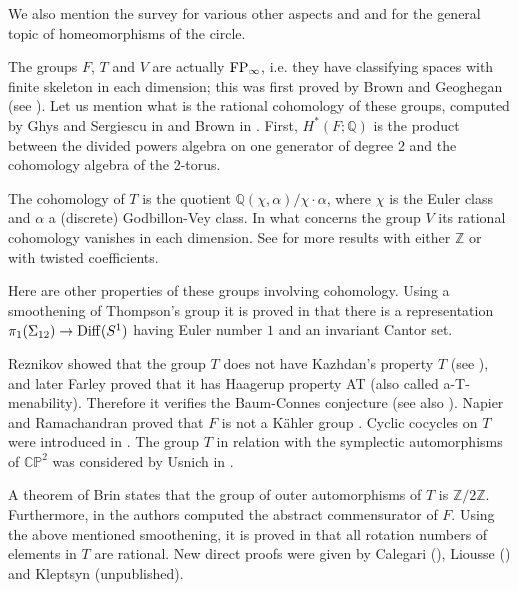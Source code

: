 \documentclass[twoside]{irmaems}
\theoremstyle{plain}
\theoremstyle{definition}
\theoremstyle{remark}
\newcommand{\Z}{{\mathbb{Z}}}
\newcommand{\Q}{{\mathbb{Q}}}
\begin{document}
\vspace{0.1cm}\noindent 
We also mention the survey \cite{ser} for various other aspects and  \cite{Gh} and 
\cite{navas} for the general topic of homeomorphisms of the circle.

\vspace{0.1cm}\noindent 
The groups $F$, $T$ and $V$ are actually ${\rm FP}_{\infty}$, 
i.e. they have classifying spaces with finite skeleton 
in each dimension; this was first proved by Brown  
and Geoghegan (see \cite{BrGe,br1}). 
Let us mention what is the rational cohomology of these
groups, computed by Ghys and Sergiescu in \cite{gh-se} and Brown in 
\cite{br2}. First, $H^*(F;\Q)$ 
is the product between the divided powers algebra
on one generator of degree 2 and the cohomology algebra of the
2-torus.

\vspace{0.1cm}\noindent 
The cohomology of $T$ is the quotient $\Q(\chi,\alpha)/\chi\cdot \alpha$, 
where $\chi$ is the Euler class and $\alpha$ a (discrete) Godbillon-Vey class. 
In what concerns the group  $V$ its rational cohomology vanishes
in each dimension. See \cite{ser} for more results with  either 
$\Z$ or with twisted coefficients.

\vspace{0.1cm}\noindent 
Here are other properties of these groups involving cohomology.
Using a smoothening of Thompson's group it is proved in \cite{gh-se} that
there is
a representation  $\pi_1(\Sigma_{12})\to {\rm Diff}(S^1)$ 
having Euler number $1$  and 
an invariant Cantor set.

\vspace{0.1cm}\noindent 
Reznikov showed that the group $T$ does not have Kazhdan's property $T$  
(see \cite{reznikov}),
and later Farley \cite{farley} proved that it has Haagerup property AT 
(also called a-T-menability). Therefore it
verifies the Baum-Connes conjecture (see also \cite{Fa}).
Napier and Ramachandran proved that $F$ is not a K\"ahler group \cite{rama}.
Cyclic cocycles on $T$ were introduced in \cite{oyko}. The group $T$ 
in relation with the symplectic automorphisms of $\mathbb C\mathbb P^2$ 
was considered by Usnich in \cite{usnich}. 

\vspace{0.1cm}\noindent 
A theorem of Brin \cite{brin-ihes} 
states that the group of outer automorphisms of $T$ is 
$\Z/2\Z$. Furthermore, in \cite{BCR} the authors computed the 
abstract commensurator of $F$. 
Using the above mentioned smoothening, it is proved in \cite{gh-se} that all
rotation numbers of elements in $T$ are rational. 
New direct proofs were given by
Calegari (\cite{calegari}), Liousse (\cite{liousse}) and 
Kleptsyn (unpublished).
\end{document}
